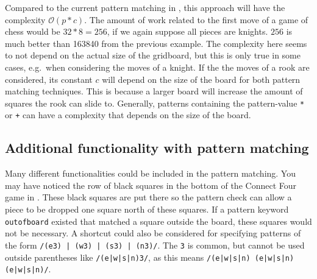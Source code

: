Compared to the current pattern matching in \productname{}, this
approach will have the complexity $\mathcal{O}(p * c)$. The amount of
work related to the first move of a game of chess would be $32 * 8 =
256$, if we again suppose all pieces are knights. $256$ is much better
than \num{163840} from the previous example. The complexity here seems
to not depend on the actual size of the gridboard, but this is only
true in some cases, e.g.\ when considering the moves of a knight. If
the the moves of a rook are considered, its constant $c$ will depend
on the size of the board for both pattern matching techniques. This is
because a larger board will increase the amount of squares the rook can
slide to. Generally, patterns containing the pattern-value \texttt{*} or
\texttt{+} can have a complexity that depends on the size of the board.


\subsection{Additional functionality with pattern matching}
Many different functionalities could be included in the
pattern matching. You may have noticed the row of black
squares in the bottom of the Connect Four game in
. These black squares are put there so the
pattern check can allow a piece to be dropped one square north of these
squares. If a pattern keyword \texttt{outofboard} existed that matched
a square outside the board, these squares would not be necessary. A
shortcut could also be considered for specifying patterns of the form
\texttt{/(e3) | (w3) | (s3) | (n3)/}. The \texttt{3} is common, but
cannot be used outside parentheses like \texttt{/(e|w|s|n)3/}, as this
means \texttt{/(e|w|s|n) (e|w|s|n) (e|w|s|n)/}.
